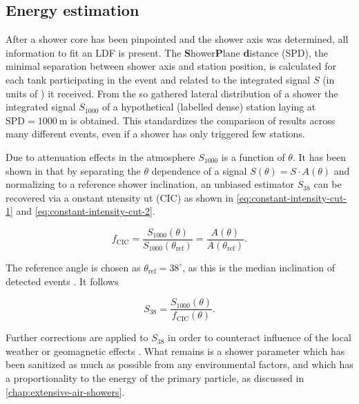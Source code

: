 \subsection{Energy estimation}
\label{ssec:energy-estimation}

After a shower core has been pinpointed and the shower axis was determined, all information to fit an LDF is present. The \textbf{S}hower\textbf{P}lane 
\textbf{d}istance (SPD), the minimal separation between shower axis and station position, is calculated for each tank participating in the event and related to the
integrated signal $S$ (in units of \Qpeak) it received. From the so gathered lateral distribution of a shower the integrated signal $S_{1000}$ of a hypothetical 
(labelled dense) station laying at $\text{SPD} = \SI{1000}{\meter}$ is obtained.
This standardizes the comparison of results across many different events, even if a shower has only triggered few stations. 

Due to attenuation effects in the atmosphere $S_{1000}$ is a function of $\theta$. It has been shown in \cite{DarkoCIC} that by separating the $\theta$ dependence
of a signal $S(\theta) = S\cdot A(\theta)$ and normalizing to a reference shower inclination, an unbiased estimator $S_{38}$ can be recovered via a 
onstant ntensity ut (CIC) as shown in \autoref{eq:constant-intensity-cut-1} and \autoref{eq:constant-intensity-cut-2}.

\begin{equation}
\label{eq:constant-intensity-cut-1}
f_\text{CIC} = \frac{S_{1000}(\theta)}{S_{1000}(\theta_\text{ref})}=\frac{A(\theta)}{A(\theta_\text{ref})}.
\end{equation}

The reference angle is chosen as $\theta_\text{ref} = 38^\circ$, as this is the median inclination of detected events . It follows

\begin{equation}
\label{eq:constant-intensity-cut-2}
S_{38} = \frac{S_{1000}(\theta)}{f_\text{CIC}(\theta)}.
\end{equation}

Further corrections are applied to $S_{38}$ in order to counteract influence of the local weather or geomagnetic effects . What remains is a shower 
parameter which has been sanitized as much as possible from any environmental factors, and which has a proportionality to the energy of the primary particle, 
as discussed in \autoref{chap:extensive-air-showers}.

